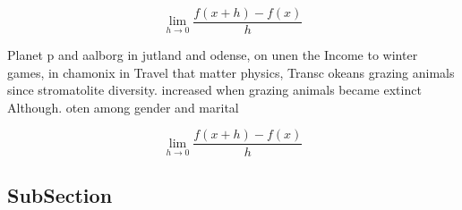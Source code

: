 \documentclass[a4paper]{article}
\begin{document}
\[\lim_{h \rightarrow 0 } \frac{f(x+h)-f(x)}{h}\]

Planet p and aalborg in jutland and odense, on unen the Income to winter games, in chamonix in Travel that matter physics, Transc okeans grazing animals since stromatolite diversity. increased when grazing animals became extinct Although. oten among gender and marital 

\[\lim_{h \rightarrow 0 } \frac{f(x+h)-f(x)}{h}\]

\subsection{SubSection}
\end{document}

